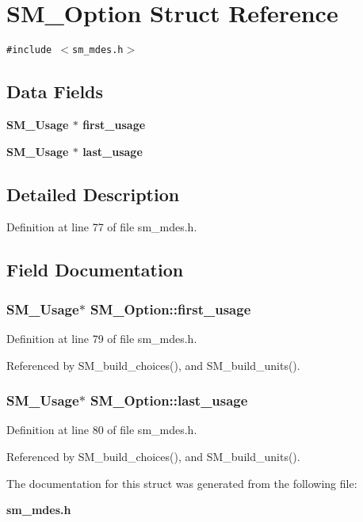 \section{SM\_\-Option Struct Reference}
\label{structSM__Option}
{\tt \#include $<$sm\_\-mdes.h$>$}

\subsection*{Data Fields}
\begin{CompactItemize}
\item 
\bf{SM\_\-Usage} $\ast$ \bf{first\_\-usage}
\item 
\bf{SM\_\-Usage} $\ast$ \bf{last\_\-usage}
\end{CompactItemize}


\subsection{Detailed Description}




Definition at line 77 of file sm\_\-mdes.h.

\subsection{Field Documentation}
\subsubsection{\setlength{\rightskip}{0pt plus 5cm}\bf{SM\_\-Usage}$\ast$ \bf{SM\_\-Option::first\_\-usage}}\label{structSM__Option_98eecda72c401adaa440e747dfc710e4}




Definition at line 79 of file sm\_\-mdes.h.

Referenced by SM\_\-build\_\-choices(), and SM\_\-build\_\-units().
\subsubsection{\setlength{\rightskip}{0pt plus 5cm}\bf{SM\_\-Usage}$\ast$ \bf{SM\_\-Option::last\_\-usage}}\label{structSM__Option_49b8120ea400a64882c8cd2b4c974fa3}




Definition at line 80 of file sm\_\-mdes.h.

Referenced by SM\_\-build\_\-choices(), and SM\_\-build\_\-units().

The documentation for this struct was generated from the following file:\begin{CompactItemize}
\item 
\bf{sm\_\-mdes.h}\end{CompactItemize}
